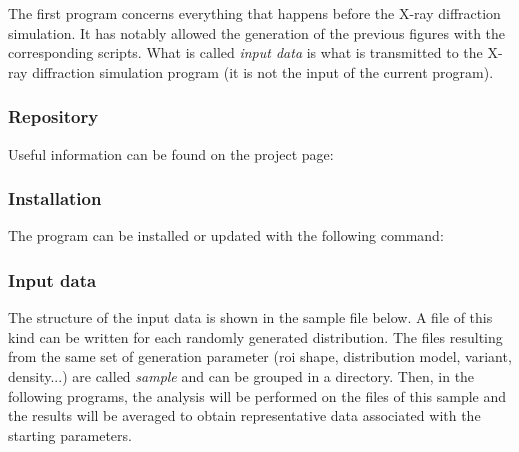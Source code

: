 The first program concerns everything that happens before the X-ray diffraction simulation.
It has notably allowed the generation of the previous figures with the corresponding scripts.
What is called \textit{input data} is what is transmitted to the X-ray diffraction simulation program (it is not the input of the current program).

\subsubsection{Repository}

Useful information can be found on the project page: 

\subsubsection{Installation}

The program can be installed or updated with the following command:


\subsubsection{Input data}

The structure of the input data is shown in the sample file below.
A file of this kind can be written for each randomly generated distribution.
The files resulting from the same set of generation parameter (\gls{roi} shape, distribution model, variant, density...) are called \textit{sample} and can be grouped in a directory.
Then, in the following programs, the analysis will be performed on the files of this sample and the results will be averaged to obtain representative data associated with the starting parameters.

\smallskip


